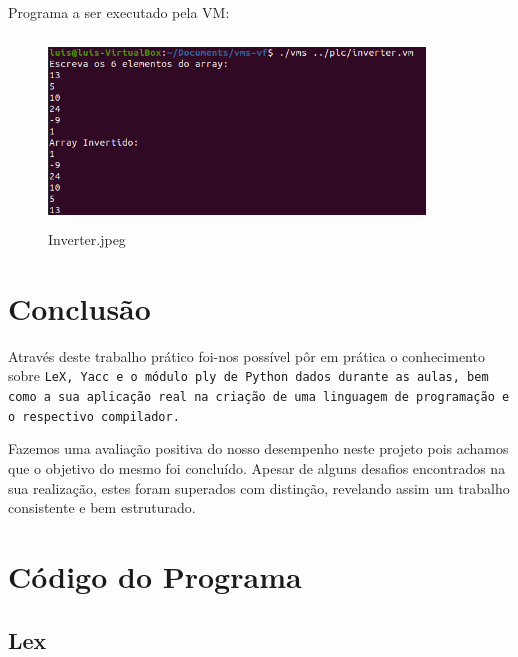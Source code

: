 \documentclass{article}
\begin{document}
Programa a ser executado pela VM:
\begin{figure}[h]
\centering
\includegraphics[width=10cm,height=5cm]{Inverter.jpeg}
\caption{Inverter.jpeg}
\end{figure}

\clearpage



\vspace{1CM}

\section{Conclusão} \label{sec:Conclusão}
\setlength{\parindent}{5ex} Através deste trabalho prático foi-nos possível pôr em prática o conhecimento sobre \tt{LeX}, \tt{Yacc} e o módulo {\tt ply} de Python dados durante as aulas, bem como a sua aplicação real na criação de uma linguagem de programação e o respectivo compilador.
\par Fazemos uma avaliação positiva do nosso desempenho neste projeto pois achamos que o objetivo do mesmo foi concluído. Apesar de alguns desafios encontrados na sua realização, estes foram superados com distinção, revelando assim um trabalho consistente e bem estruturado.

\clearpage

\appendix
\section{Código do Programa}
\subsection{Lex}
\end{document}

